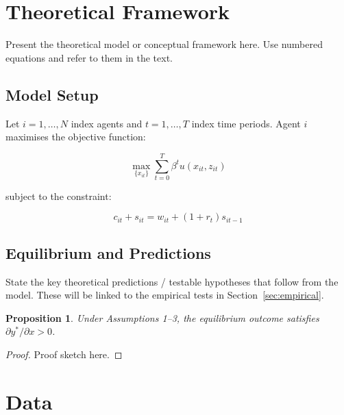 \documentclass[12pt, a4paper]{article}
\newtheorem{proposition}{Proposition}
\theoremstyle{definition}
\theoremstyle{remark}
\begin{document}
\section{Theoretical Framework}
\label{sec:theory}

Present the theoretical model or conceptual framework here. Use numbered equations
and refer to them in the text.

\subsection{Model Setup}

Let $i = 1, \dots, N$ index agents and $t = 1, \dots, T$ index time periods.
Agent $i$ maximises the objective function:

\begin{equation}
    \max_{\{x_{it}\}} \sum_{t=0}^{T} \beta^{t} u(x_{it}, z_{it})
    \label{eq:objective}
\end{equation}

\noindent subject to the constraint:

\begin{equation}
    c_{it} + s_{it} = w_{it} + (1 + r_{t}) s_{it-1}
    \label{eq:budget}
\end{equation}

\subsection{Equilibrium and Predictions}

State the key theoretical predictions / testable hypotheses that follow from the
model. These will be linked to the empirical tests in Section~\ref{sec:empirical}.

\begin{proposition}
    Under Assumptions 1–3, the equilibrium outcome satisfies $\partial y^{*} / \partial x > 0$.
\end{proposition}

\begin{proof}
    Proof sketch here.
\end{proof}

\section{Data}
\label{sec:data}
\end{document}
